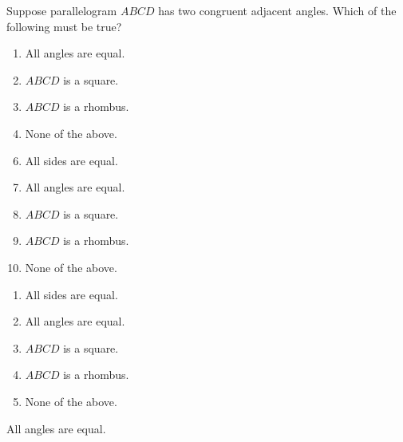 


  Suppose parallelogram $ABCD$ has two congruent adjacent angles. Which of the following must be true?



\ifsat
	\begin{enumerate}[label=\Alph*)]
		\item   All angles are equal.%
		\item   $ABCD$ is a square.
		\item  $ABCD$ is a rhombus.
		\item  None of the above.
	\end{enumerate}
\else
\fi

\ifacteven
	\begin{enumerate}[label=\textbf{\Alph*.},itemsep=\fill,align=left]
		\setcounter{enumii}{5}
		\item    All sides are equal.
		\item   All angles are equal.%
		\item   $ABCD$ is a square.
		\addtocounter{enumii}{1}
		\item  $ABCD$ is a rhombus.
		\item  None of the above.
	\end{enumerate}
\else
\fi

\ifactodd
	\begin{enumerate}[label=\textbf{\Alph*.},itemsep=\fill,align=left]
		\item    All sides are equal.
		\item   All angles are equal.%
		\item   $ABCD$ is a square.
		\item  $ABCD$ is a rhombus.
		\item  None of the above.
	\end{enumerate}
\else
\fi

\ifgridin
   All angles are equal.%
		
\else
\fi

